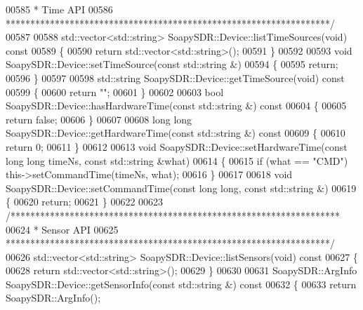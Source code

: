 \begin{DoxyCode}
00585 \textcolor{comment}{ * Time API}
00586 \textcolor{comment}{ ******************************************************************/}
00587 
00588 std::vector<std::string> SoapySDR::Device::listTimeSources(\textcolor{keywordtype}{void})\textcolor{keyword}{ const}
00589 \textcolor{keyword}{}\{
00590     \textcolor{keywordflow}{return} std::vector<std::string>();
00591 \}
00592 
00593 \textcolor{keywordtype}{void} SoapySDR::Device::setTimeSource(\textcolor{keyword}{const} std::string &)
00594 \{
00595     \textcolor{keywordflow}{return};
00596 \}
00597 
00598 std::string SoapySDR::Device::getTimeSource(\textcolor{keywordtype}{void})\textcolor{keyword}{ const}
00599 \textcolor{keyword}{}\{
00600     \textcolor{keywordflow}{return} \textcolor{stringliteral}{""};
00601 \}
00602 
00603 \textcolor{keywordtype}{bool} SoapySDR::Device::hasHardwareTime(\textcolor{keyword}{const} std::string &)\textcolor{keyword}{ const}
00604 \textcolor{keyword}{}\{
00605     \textcolor{keywordflow}{return} \textcolor{keyword}{false};
00606 \}
00607 
00608 \textcolor{keywordtype}{long} \textcolor{keywordtype}{long} SoapySDR::Device::getHardwareTime(\textcolor{keyword}{const} std::string &)\textcolor{keyword}{ const}
00609 \textcolor{keyword}{}\{
00610     \textcolor{keywordflow}{return} 0;
00611 \}
00612 
00613 \textcolor{keywordtype}{void} SoapySDR::Device::setHardwareTime(\textcolor{keyword}{const} \textcolor{keywordtype}{long} \textcolor{keywordtype}{long} timeNs, \textcolor{keyword}{const} std::string &what)
00614 \{
00615     \textcolor{keywordflow}{if} (what == \textcolor{stringliteral}{"CMD"}) this->setCommandTime(timeNs, what);
00616 \}
00617 
00618 \textcolor{keywordtype}{void} SoapySDR::Device::setCommandTime(\textcolor{keyword}{const} \textcolor{keywordtype}{long} \textcolor{keywordtype}{long}, \textcolor{keyword}{const} std::string &)
00619 \{
00620     \textcolor{keywordflow}{return};
00621 \}
00622 
00623 \textcolor{comment}{/*******************************************************************}
00624 \textcolor{comment}{ * Sensor API}
00625 \textcolor{comment}{ ******************************************************************/}
00626 std::vector<std::string> SoapySDR::Device::listSensors(\textcolor{keywordtype}{void})\textcolor{keyword}{ const}
00627 \textcolor{keyword}{}\{
00628     \textcolor{keywordflow}{return} std::vector<std::string>();
00629 \}
00630 
00631 SoapySDR::ArgInfo SoapySDR::Device::getSensorInfo(\textcolor{keyword}{const} std::string &)\textcolor{keyword}{ const}
00632 \textcolor{keyword}{}\{
00633     \textcolor{keywordflow}{return} SoapySDR::ArgInfo();

\end{DoxyCode}
